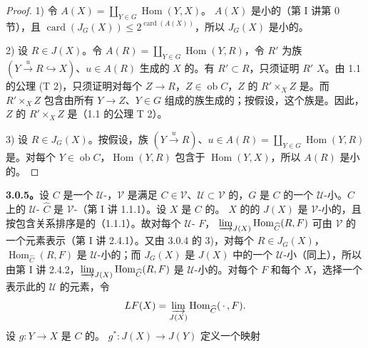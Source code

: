 \begin{proof}
1) 令 $A(X)=\coprod_{Y\in G}\operatorname{Hom}(Y,X)$。 $A(X)$ 是小的（第 I 讲第 0 节），且 $\operatorname{card}(J_G(X))\leq 2^{\operatorname{card}(A(X))}$，所以 $J_G(X)$ 是小的。

2) 设 $R\in J(X)$。令 $A(R)=\coprod_{Y\in G}\operatorname{Hom}(Y,R)$，令 $R'$ 为族 $(Y\xrightarrow{u}R\hookrightarrow X)$、$u\in A(R)$ 生成的 $X$ 的。有 $R'\subset R$，只须证明 $R'$  $X$。由 1.1 的公理 (T 2)，只须证明对每个 $Z\to R$，$Z\in\operatorname{ob}C$，$Z$ 的 $R'\times_XZ$ 是。而 $R'\times_XZ$ 包含由所有 $Y\to Z$、$Y\in G$ 组成的族生成的；按假设，这个族是。因此，$Z$ 的 $R'\times_XZ$ 是（1.1 的公理 T 2）。

3) 设 $R\in J_G(X)$。按假设，族 $(Y\xrightarrow{u}R)$、$u\in A(R)=\coprod_{Y\in G}\operatorname{Hom}(Y,R)$ 是。对每个 $Y\in\operatorname{ob}C$，$\operatorname{Hom}(Y,R)$ 包含于 $\operatorname{Hom}(Y,X)$，所以 $A(R)$ 是小的。
\end{proof}
\textbf{3.0.5。}设 $C$ 是一个 $\mathcal U$-，$\mathcal V$ 是满足 $C\in\mathcal V$、$\mathcal U\subset\mathcal V$ 的，$G$ 是 $C$ 的一个 $\mathcal U$-小。$C$ 上的 $\mathcal U$- $\widehat C$ 是 $\mathcal V$-（第 I 讲 1.1.1）。设 $X$ 是 $C$ 的。 $X$ 的的 $J(X)$ 是 $\mathcal V$-小的，且按包含关系排序是的（1.1.1）。故对每个 $\mathcal U$- $F$， $\varinjlim_{J(X)}\operatorname{Hom}_{\widehat C}(R,F)$ 可由 $\mathcal V$ 的一个元素表示（第 I 讲 2.4.1）。又由 3.0.4 的 3)，对每个 $R\in J_G(X)$，$\operatorname{Hom}_{\widehat C}(R,F)$ 是 $\mathcal U$-小的；而 $J_G(X)$ 是 $J(X)$ 中的一个 $\mathcal U$-小（同上），所以由第 I 讲 2.4.2，$\varinjlim_{J(X)}\operatorname{Hom}_{\widehat C}(R,F)$ 是 $\mathcal U$-小的。对每个 $F$ 和每个 $X$，选择一个表示此的 $\mathcal U$ 的元素，令
\[LF(X)=\varinjlim_{J(X)}\operatorname{Hom}_{\widehat C}(\,\cdot\,,F).\]
设 $g:Y\to X$ 是 $C$ 的。 $g^*:J(X)\to J(Y)$ 定义一个映射

